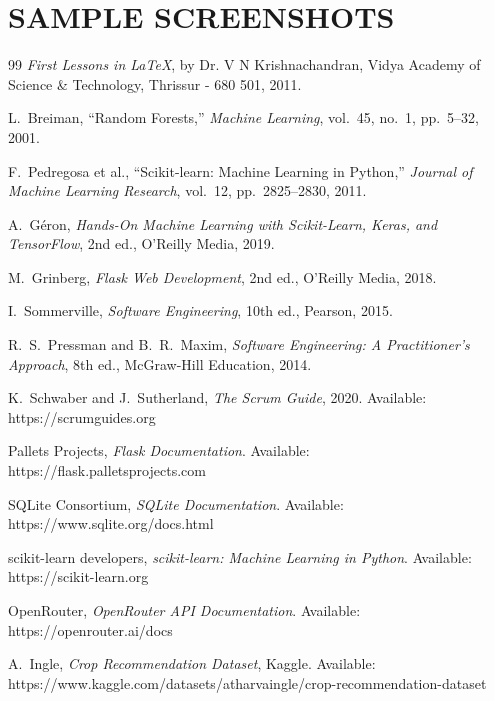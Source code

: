 \chapter{SAMPLE SCREENSHOTS}


%
%
%
%
\clearpage
{}
%
%
\begin{thebibliography}{99}
%
{\em First Lessons in \LaTeX}, by Dr. V N Krishnachandran, 
Vidya Academy of Science \& Technology, 
Thrissur - 680 501, 2011.

L.~Breiman, ``Random Forests,'' {\em Machine Learning}, vol.~45, no.~1, pp.~5--32, 2001.

F.~Pedregosa et al., ``Scikit-learn: Machine Learning in Python,'' {\em Journal of Machine Learning Research}, vol.~12, pp.~2825--2830, 2011.

A.~G\'{e}ron, {\em Hands-On Machine Learning with Scikit-Learn, Keras, and TensorFlow}, 2nd ed., O'Reilly Media, 2019.

M.~Grinberg, {\em Flask Web Development}, 2nd ed., O'Reilly Media, 2018.

I.~Sommerville, {\em Software Engineering}, 10th ed., Pearson, 2015.

R.~S.~Pressman and B.~R.~Maxim, {\em Software Engineering: A Practitioner's Approach}, 8th ed., McGraw-Hill Education, 2014.

K.~Schwaber and J.~Sutherland, {\em The Scrum Guide}, 2020. Available: https://scrumguides.org

Pallets Projects, {\em Flask Documentation}. Available: https://flask.palletsprojects.com

SQLite Consortium, {\em SQLite Documentation}. Available: https://www.sqlite.org/docs.html

scikit-learn developers, {\em scikit-learn: Machine Learning in Python}. Available: https://scikit-learn.org

OpenRouter, {\em OpenRouter API Documentation}. Available: https://openrouter.ai/docs

A.~Ingle, {\em Crop Recommendation Dataset}, Kaggle. Available: https://www.kaggle.com/datasets/atharvaingle/crop-recommendation-dataset







%
\end{thebibliography}
%
%
%

%
%
%
%
